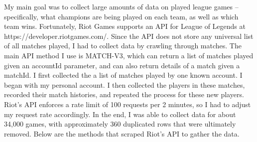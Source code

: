 \documentclass[11pt]{article}
\begin{document}
    My main goal was to collect large amounts of data on played league games
-- specifically, what champions are being played on each team, as well
as which team wins. Fortunately, Riot Games supports an API for League
of Legends at https://developer.riotgames.com/. Since the API does not
store any universal list of all matches played, I had to collect data by
crawling through matches. The main API method I use is MATCH-V3, which
can return a list of matches played given an accountId parameter, and
can also return details of a match given a matchId. I first collected
the a list of matches played by one known account. I began with my
personal account. I then collected the players in these matches,
recorded their match histories, and repeated the process for these new
players. Riot's API enforces a rate limit of 100 requests per 2 minutes,
so I had to adjust my request rate accordingly. In the end, I was able
to collect data for about 34,000 games, with approximately 360
duplicated rows that were ultimately removed. Below are the methods that
scraped Riot's API to gather the data.
\end{document}
